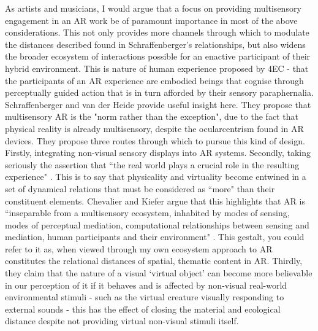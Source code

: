 As artists and musicians, I would argue that a focus on providing multisensory engagement in an AR work be of paramount importance in most of the above considerations. This not only provides more channels through which to modulate the distances described found in Schraffenberger's relationships, but also widens the broader ecosystem of interactions possible for an enactive participant of their hybrid environment. This is nature of human experience proposed by 4EC - that the participants of an AR experience are embodied beings that cognise through perceptually guided action that is in turn afforded by their sensory paraphernalia. Schraffenberger and van der Heide provide useful insight here. They propose that multisensory AR is the "norm rather than the exception", due to the fact that physical reality is already multisensory, despite the ocularcentrism found in AR devices. They propose three routes through which to pursue this kind of design. Firstly, integrating non-visual sensory displays into  AR systems. Secondly, taking seriously the assertion that ``the real world plays a crucial role in the resulting experience" \citep[p. 5]{schraffenberger2016}. This is to say that physicality and virtuality become entwined in a set of dynamical relations that must be considered as ``more" than their constituent elements. Chevalier and Kiefer argue that this highlights that AR is ``inseparable from a multisensory ecosystem, inhabited by modes of sensing, modes of perceptual mediation, computational relationships between sensing and mediation, human participants and their environment" \citeyearpar[p. 4]{chevalier2020}. This gestalt, you could refer to it as, when viewed through my own ecosystem approach to AR constitutes the relational distances of spatial, thematic content in AR. Thirdly, they claim that the nature of a visual `virtual object' can become more believable in our perception of it if it behaves and is affected by non-visual real-world environmental stimuli - such as the virtual creature visually responding to external sounds - this has the effect of closing the material and ecological distance despite not providing virtual non-visual stimuli itself. 

